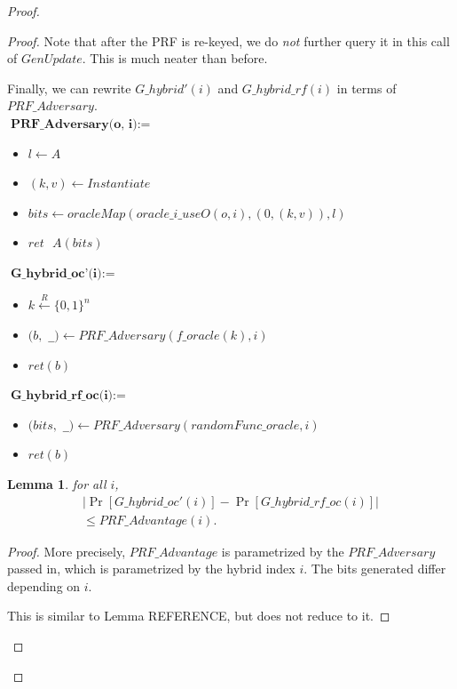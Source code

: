 \documentclass[12pt,lot, lof]{puthesis}
\newenvironment{game}
{ \begin{itemize}[noitemsep,nolistsep] 
}
{ \end{itemize}                  }
\newcommand{\s} {\textrm{ }}
\newcommand{\li} {\lstinline}
\newcommand{\samp}{\xleftarrow{R} \{0,1\}}
\newcommand{\lar}{\leftarrow}
\newtheorem{lem}{Lemma}[thm]
\begin{document}
{\begin{proof}
\begin{proof}
Note that after the PRF is re-keyed, we do \emph{not} further query it in this call of $GenUpdate$. This is much neater than before.

Finally, we can rewrite $G\_hybrid'(i)$ and $G\_hybrid\_rf(i)$ in terms of $PRF\_Adversary$. \\

$\textbf{PRF\_Adversary(o, i)} := $
\begin{game}
\item[] $l \leftarrow A$
\item[] $(k,v) \leftarrow Instantiate$
\item[] $bits \lar oracleMap(oracle\_i\_useO(o, i),(0, (k, v)),l)$
\item[] $ret \s A(bits)$ \\
\end{game}

$\textbf{G\_hybrid\_oc'(i)} := $
\begin{game}
\item[] $k \samp^n$
\item[] $(b, $ \li|_|$) \lar PRF\_Adversary (f\_oracle(k), i)$
\item[] $ ret(b)$ \\
\end{game}

$\textbf{G\_hybrid\_rf\_oc(i)} := $
\begin{game}
\item[] $(bits, $ \li|_|$) \lar PRF\_Adversary (randomFunc\_oracle, i)$
\item[] $ret(b)$ \\
\end{game}

\begin{lem} for all $i$,
\begin{gather*} 
| \Pr[G\_hybrid\_oc'(i) ] - \Pr[G\_hybrid\_rf\_oc(i)] | \\
\leq PRF\_Advantage(i).
\end{gather*}
\end{lem}
\begin{proof}
More precisely, $PRF\_Advantage$ is parametrized by the $PRF\_Adversary$ passed in, which is parametrized by the hybrid index $i$. The bits generated differ depending on $i$.

This is similar to Lemma REFERENCE, but does not reduce to it.
\end{proof}


\end{proof}
\end{proof}}
\end{document}

